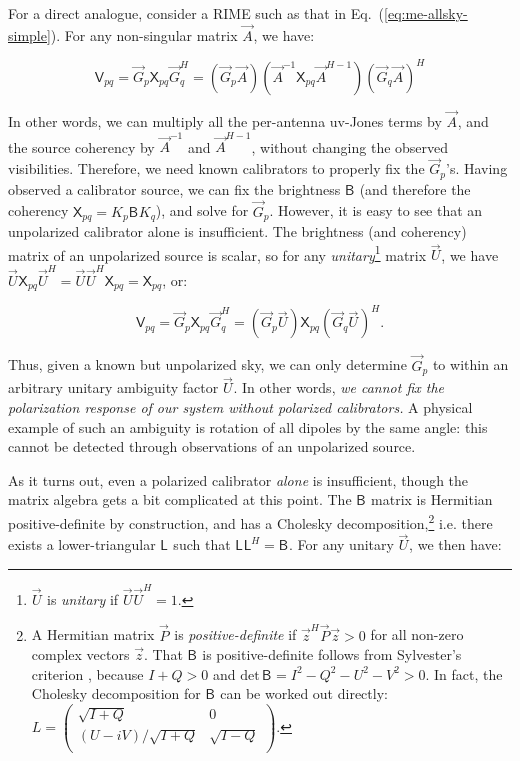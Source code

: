 \documentclass{aa}
\newcommand{\matrixtt}[4]{\left( \begin{array}{cc}#1&#2\\#3&#4\\\end{array} \right)}
\newcommand{\herm}{H}
\newcommand{\jones}[2]{\vec {#1}_{#2}}
\newcommand{\jonesinv}[2]{\vec {#1}^{-1}_{#2}}
\newcommand{\jonesT}[2]{\vec {#1}^{\herm}_{#2}}
\newcommand{\jonesTinv}[2]{\vec {#1}^{{\herm}-1}_{#2}}
\newcommand{\coh}[2]{\mathsf{{#1}}_{{#2}}}
\begin{document}
For a direct analogue, consider a RIME such as that in Eq.~(\ref{eq:me-allsky-simple}). For any non-singular matrix $\jones{A}{}$, we have: 

\[
\coh{V}{pq} = \jones{G}{p} \coh{X}{pq} \jonesT{G}{q} = 
(\jones{G}{p} \jones{A}{})(\jonesinv{A}{} \coh{X}{pq} \jonesTinv{A}{})(\jones{G}{q} \jones{A}{})^H \]

In other words, we can multiply all the per-antenna uv-Jones terms by $\jones{A}{}$, and the source coherency by $\jonesinv{A}{}$ and $\jonesTinv{A}{}$, without changing the observed visibilities. Therefore, we need known calibrators to properly fix the $\jones{G}{p}$'s. Having observed a calibrator source, we can fix the brightness $\coh{B}{}$ (and therefore the coherency $\coh{X}{pq}=K_p\coh{B}{}K_q$), and solve for $\jones{G}{p}$. However, it is easy to see that an unpolarized calibrator alone is insufficient. The brightness (and coherency) matrix of an unpolarized source is scalar, so for any {\em unitary}\footnote{$\jones{U}{}$ is {\em unitary} if $\jones{U}{}\jonesT{U}{}=1$.} matrix $\jones{U}{}$, we have $\jones{U}{}\coh{X}{pq}\jonesT{U}{}=\jones{U}{}\jonesT{U}{}\coh{X}{pq} = \coh{X}{pq}$, or: 

\[
\coh{V}{pq} = \jones{G}{p} \coh{X}{pq} \jonesT{G}{q} = (\jones{G}{p} \jones{U}{}) \coh{X}{pq} (\jones{G}{q} \jones{U}{} )^\herm.
\]

Thus, given a known but unpolarized sky, we can only determine $\jones{G}{p}$ to within an arbitrary unitary ambiguity factor $\jones{U}{}$. In other words, {\em we cannot fix the polarization response of our system without polarized calibrators.} A physical example of such an ambiguity is rotation of all dipoles by the same angle: this cannot be detected through observations of an unpolarized source.

As it turns out, even a polarized calibrator {\em alone} is insufficient, though the matrix algebra gets a bit complicated at this point. The $\coh{B}{}$ matrix is Hermitian positive-definite by construction, and has a Cholesky 
decomposition,\footnote{A Hermitian matrix $\jones{P}{}$ is {\em positive-definite} if $\vec z^\herm\jones{P}{}\vec z > 0$ for all non-zero complex vectors $\vec z$. That $\coh{B}{}$ is positive-definite follows from Sylvester's criterion \citep{Gilbert:SylvestersCriterion}, because $I+Q>0$ and $\mathrm{det}\,\coh{B}{}=I^2-Q^2-U^2-V^2>0$. In fact, the Cholesky decomposition for $\coh{B}{}$ can be worked out directly: $L=\matrixtt{\sqrt{I+Q}}{0}{(U-iV)/\sqrt{I+Q}}{\sqrt{I-Q}}.$} 
i.e. there exists a lower-triangular $\coh{L}{}$ such that $\coh{L}{}\coh{L}{}^H=\coh{B}{}$. For any unitary $\jones{U}{}$, we then have:
\end{document}

